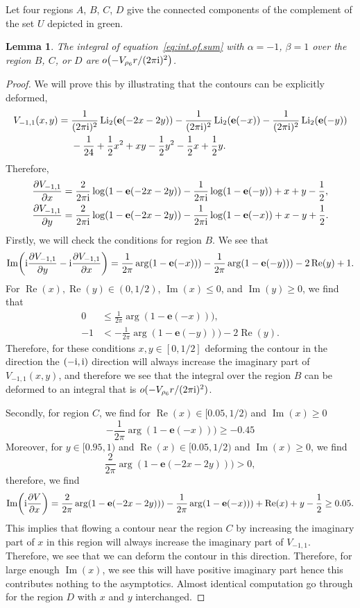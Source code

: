 \documentclass[pdftex]{sigma}
\numberwithin{equation}{section}
\newtheorem{Lemma}[Theorem]{Lemma}
\def\Li{\mathrm{Li}}
\def\e{\mathbf e}
\def\Li{\operatorname{Li}}
\def\Re{\operatorname{Re}}
\def\Im{\operatorname{Im}}
\begin{document}
Let four regions $A$, $B$, $C$, $D$ give the connected components of the complement of the set $U$ depicted in green.
\begin{Lemma}\label{lem:BCDsmall}
The integral of equation~\eqref{eq:int.of.sum} with $\alpha=-1$, $\beta=1$ over the region $B$, $C$, or $D$ are $o\bigl(-V_{\rho_6}r/(2\pi {\rm i})^2\bigr)$.
\end{Lemma}
\begin{proof}
We will prove this by illustrating that the contours can be explicitly deformed,
\begin{align*}
 V_{-1,1}(x,y) ={}&\frac{1}{(2\pi {\rm i})^2}\Li_2(\e(-2x-2y))-\frac{1}{(2\pi {\rm i})^2}\Li_2(\e(-x))-\frac{1}{(2\pi {\rm i})^2}\Li_2(\e(-y))\\
 & -\frac{1}{24}+\frac{1}{2}x^2+xy-\frac{1}{2}y^2-\frac{1}{2}x+\frac{1}{2}y.
\end{align*}
Therefore,
\[
\begin{aligned}
 \frac{\partial V_{-1,1}}{\partial x}
 & =
 \frac{2}{2\pi {\rm i}}\log(1-\e(-2x-2y))-\frac{1}{2\pi {\rm i}}\log(1-\e(-y))+x+y-\frac{1}{2} ,\\
 \frac{\partial V_{-1,1}}{\partial y}
 & =
 \frac{2}{2\pi {\rm i}}\log(1-\e(-2x-2y))-\frac{1}{2\pi {\rm i}}\log(1-\e(-x))+x-y+\frac{1}{2} .
\end{aligned}
\]
Firstly, we will check the conditions for region $B$.
We see that
\[
 \Im\biggl({\rm i}\frac{\partial V_{-1,1}}{\partial y}-{\rm i}\frac{\partial V_{-1,1}}{\partial x}\biggr)
  =
 \frac{1}{2\pi}\arg(1-\e(-x)))
 -\frac{1}{2\pi}\arg(1-\e(-y)))
 -2\Re(y)+1 .
\]
For $\Re(x),\Re(y)\in(0,1/2)$, $\Im(x)\leq0$, and $\Im(y)\geq0$, we find that
\[
\begin{aligned}
 0&\leq\frac{1}{2\pi}\arg(1-\e(-x))) ,\\
 -1&<-\frac{1}{2\pi}\arg(1-\e(-y)))
 -2\Re(y) .
\end{aligned}
\]
Therefore, for these conditions $x,y\in[0,1/2]$ deforming the contour in the direction the $(-{\rm i},{\rm i})$ direction will always increase the imaginary part of $V_{-1,1}(x,y)$, and therefore we see that the integral over the region $B$ can be deformed to an integral that is $o(-V_{\rho_6}r/(2\pi {\rm i})^2)$.

Secondly, for region $C$, we find for $\Re(x)\in[0.05,1/2)$ and $\Im(x)\geq0$
\[
 -\frac{1}{2\pi}\arg(1-\e(-x)))
 \geq
 -0.45
\]
Moreover, for $y\in[0.95,1)$ and $\Re(x)\in[0.05,1/2)$ and $\Im(x)\geq0$, we find
\[
 \frac{2}{2\pi}\arg(1-\e(-2x-2y)))>0,
\]
therefore, we find
\[
 \Im\biggl({\rm i}\frac{\partial V}{\partial x}\biggr)
  =
 \frac{2}{2\pi}\arg(1-\e(-2x-2y)))
 -\frac{1}{2\pi}\arg(1-\e(-x)))
 +\Re(x)+y-\frac{1}{2}
 \geq
 0.05.
\]
This implies that flowing a contour near the region $C$ by increasing the imaginary part of $x$ in this region will always increase the imaginary part of $V_{-1,1}$. Therefore, we see that we can deform the contour in this direction.
Therefore, for large enough $\Im(x)$, we see this will have positive imaginary part hence this contributes nothing to the asymptotics. Almost identical computation go through for the region $D$ with $x$ and $y$ interchanged.
\end{proof}
\end{document}
